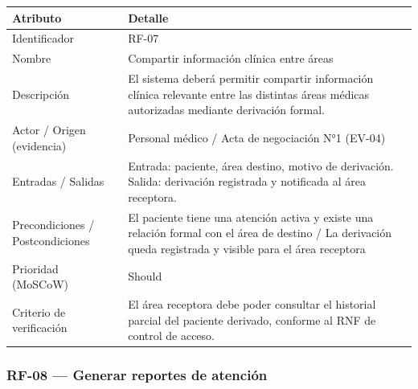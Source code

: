 \documentclass[11pt,a4paper]{article}
\begin{document}
	\begin{longtable}{p{} p{}}
		
		\toprule
		\textbf{Atributo} & \textbf{Detalle} \\
		\midrule
		\endhead
		
		Identificador & RF-07 \\
		Nombre & Compartir información clínica entre áreas \\
		Descripción & El sistema deberá permitir compartir información clínica relevante entre las distintas áreas médicas autorizadas mediante derivación formal. \\
		Actor / Origen (evidencia) & Personal médico / Acta de negociación N°1 (EV-04) \\
		Entradas / Salidas & Entrada: paciente, área destino, motivo de derivación. Salida: derivación registrada y notificada al área receptora. \\
		Precondiciones / Postcondiciones & El paciente tiene una atención activa y existe una relación formal con el área de destino / La derivación queda registrada y visible para el área receptora \\
		Prioridad (MoSCoW) & Should \\
		Criterio de verificación & El área receptora debe poder consultar el historial parcial del paciente derivado, conforme al RNF de control de acceso. \\
		
		\bottomrule
		
	\end{longtable}
	
	\subsubsection{RF-08 --- Generar reportes de atención}
	
\end{document}
